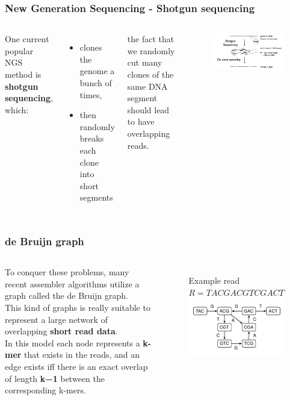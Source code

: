 \begin{frame}
\frametitle{New Generation Sequencing - Shotgun sequencing}
\begin{columns}
	One current popular NGS method is \textbf{shotgun sequencing}, which:
	\begin{itemize}
		\item  clones the genome a bunch of times,
		\item  then randomly breaks each clone into short segments
	\end{itemize}
	the fact that we randomly cut many clones of the same DNA segment should lead to have overlapping reads.
	\begin{figure}
		\includegraphics[scale=0.2]{img/shotgun.png}
	\end{figure}
\end{columns}
\end{frame}

\begin{frame}
\frametitle{de Bruijn graph}
\begin{columns}
To conquer these problems, many recent assembler algorithms utilize a
graph called the de Bruijn graph.
\\ \medskip
This kind of graphs is really suitable to represent a large network of overlapping \textbf{short read data}.
\\ \medskip
In this model each node represents a \textbf{k-mer} that exists in the reads, and an edge exists iff there is an exact
overlap of length \textbf{k−1} between the corresponding k-mers.
	\begin{figure}
	Example read $R =TACGACGTCGACT$
	\includegraphics[scale=0.4]{img/dbg-graph-simple.png}
	\end{figure}
\end{columns}
\end{frame}

